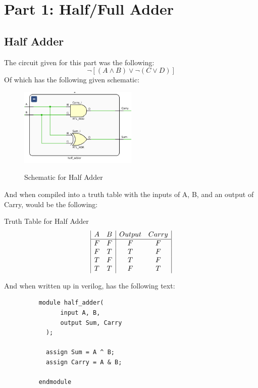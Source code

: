 \section{Part 1: Half/Full Adder}
\subsection{Half Adder}
The circuit given for this part was the following:
$$ \neg[(A \land B) \lor \neg (C \lor D)] $$
Of which has the following given schematic:
\begin{figure}[!htbp]
    \centering
    \caption{Schematic for Half Adder}
    \includegraphics[width=0.5\textwidth]{part-1-half-schem.png}
    \label{Half Adder Schematic}
\end{figure}
And when compiled into a truth table with the inputs of A, B, and an output of Carry, would be the following:
\begin{center}
    Truth Table for Half Adder
    \begin{displaymath}
    \begin{array}{|c c|c c|}
      A & B & Output & Carry\\
    \hline
    F & F & F & F \\
    F & T & T & F \\
    T & F & T & F \\
    T & T & F & T \\
    \end{array}
    \end{displaymath}
\end{center}
And when written up in verilog, has the following text:
\begin{figure}[!htbp]
    \centering
    \begin{verbatim}
    module half_adder(
          input A, B,
          output Sum, Carry
      );
      
      assign Sum = A ^ B;
      assign Carry = A & B;
      
    endmodule
    \end{verbatim}
\end{figure}

